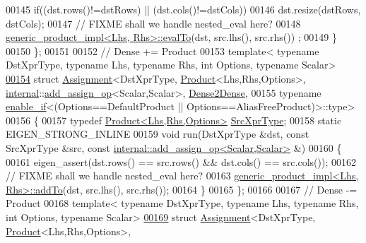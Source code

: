 \begin{DoxyCode}
00145     \textcolor{keywordflow}{if}((dst.rows()!=dstRows) || (dst.cols()!=dstCols))
00146       dst.resize(dstRows, dstCols);
00147     \textcolor{comment}{// FIXME shall we handle nested\_eval here?}
00148     \hyperlink{struct_eigen_1_1internal_1_1generic__product__impl}{generic\_product\_impl<Lhs, Rhs>::evalTo}(dst, src.lhs(), src.rhs())
      ;
00149   \}
00150 \};
00151 
00152 \textcolor{comment}{// Dense += Product}
00153 \textcolor{keyword}{template}< \textcolor{keyword}{typename} DstXprType, \textcolor{keyword}{typename} Lhs, \textcolor{keyword}{typename} Rhs, \textcolor{keywordtype}{int} Options, \textcolor{keyword}{typename} Scalar>
\hyperlink{struct_eigen_1_1internal_1_1_assignment_3_01_dst_xpr_type_00_01_product_3_01_lhs_00_01_rhs_00_01fcb8254334c8007b54d75ff97f0106b6}{00154} \textcolor{keyword}{struct }\hyperlink{struct_eigen_1_1internal_1_1_assignment}{Assignment}<DstXprType, \hyperlink{group___core___module_class_eigen_1_1_product}{Product}<Lhs,Rhs,Options>, 
      \hyperlink{namespaceinternal}{internal}::\hyperlink{struct_eigen_1_1internal_1_1add__assign__op}{add\_assign\_op}<Scalar,Scalar>, \hyperlink{struct_eigen_1_1internal_1_1_dense2_dense}{Dense2Dense},
00155   typename \hyperlink{struct_eigen_1_1internal_1_1enable__if}{enable\_if}<(Options==DefaultProduct || Options==AliasFreeProduct)>::type>
00156 \{
00157   \textcolor{keyword}{typedef} \hyperlink{group___core___module_class_eigen_1_1_product}{Product<Lhs,Rhs,Options>} \hyperlink{group___core___module_class_eigen_1_1_product}{SrcXprType};
00158   \textcolor{keyword}{static} EIGEN\_STRONG\_INLINE
00159   \textcolor{keywordtype}{void} run(DstXprType &dst, \textcolor{keyword}{const} SrcXprType &src, \textcolor{keyword}{const} 
      \hyperlink{struct_eigen_1_1internal_1_1add__assign__op}{internal::add\_assign\_op<Scalar,Scalar>} &)
00160   \{
00161     eigen\_assert(dst.rows() == src.rows() && dst.cols() == src.cols());
00162     \textcolor{comment}{// FIXME shall we handle nested\_eval here?}
00163     \hyperlink{struct_eigen_1_1internal_1_1generic__product__impl}{generic\_product\_impl<Lhs, Rhs>::addTo}(dst, src.lhs(), src.rhs());
00164   \}
00165 \};
00166 
00167 \textcolor{comment}{// Dense -= Product}
00168 \textcolor{keyword}{template}< \textcolor{keyword}{typename} DstXprType, \textcolor{keyword}{typename} Lhs, \textcolor{keyword}{typename} Rhs, \textcolor{keywordtype}{int} Options, \textcolor{keyword}{typename} Scalar>
\hyperlink{struct_eigen_1_1internal_1_1_assignment_3_01_dst_xpr_type_00_01_product_3_01_lhs_00_01_rhs_00_01ed0bc91f79379e8268cc6b22ba7de0c6}{00169} \textcolor{keyword}{struct }\hyperlink{struct_eigen_1_1internal_1_1_assignment}{Assignment}<DstXprType, \hyperlink{group___core___module_class_eigen_1_1_product}{Product}<Lhs,Rhs,Options>, 

\end{DoxyCode}
